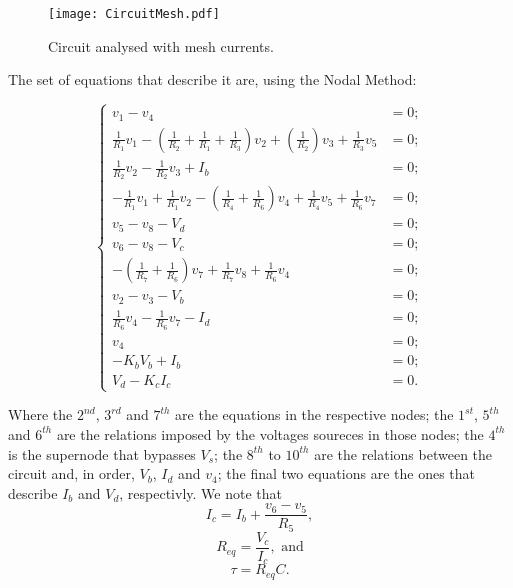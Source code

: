 \begin{figure}[h] \centering
\texttt{[image: CircuitMesh.pdf]}
\caption{Circuit analysed with mesh currents.}
\label{fig:Circuit_Passo2}
\end{figure}

The set of equations that describe it are, using the Nodal Method:

\begin{equation}
\begin{cases}
	v_1 - v_4 &= 0;																				  	  \\
	\frac{1}{R_1}v_1 - (\frac{1}{R_2}+\frac{1}{R_1}+\frac{1}{R_3})v_2 + (\frac{1}{R_2})v_3 + \frac{1}{R_3}v_5 &= 0; \\
  	\frac{1}{R_2}v_2 - \frac{1}{R_2}v_3+ I_b &= 0;													  \\
  	-\frac{1}{R_1}v_1 + \frac{1}{R_1}v_2 - (\frac{1}{R_4}+\frac{1}{R_6})v_4 + \frac{1}{R_4}v_5 + \frac{1}{R_6}v_7 &= 0;			  																	  \\
	v_5 - v_8 - V_d &= 0;																			  \\
  	v_6 - v_8 - V_c &= 0;											  	  							  \\
  	-(\frac{1}{R_7}+\frac{1}{R_6})v_7 + \frac{1}{R_7}v_8 + \frac{1}{R_6}v_4 &= 0;					  \\
	v_2 - v_3 - V_b &= 0;																			  \\
  	\frac{1}{R_6}v_4 - \frac{1}{R_6}v_7 - I_d &= 0;													  \\
  	v_4 &= 0;																						  \\
  	-K_bV_b + I_b &= 0;																				  \\
  	V_d - K_cI_c &= 0.
\end{cases}
\end{equation}

Where the $2^{nd}$, $3^{rd}$ and $7^{th}$ are the equations in the respective nodes; the $1^{st}$, $5^{th}$ and $6^{th}$ are the relations imposed by the voltages soureces in those nodes; the $4^{th}$ is the supernode that bypasses $V_s$; the $8^{th}$ to $10^{th}$ are the relations between the circuit and, in order, $V_b$, $I_d$ and $v_4$; the final two equations are the ones that describe $I_b$ and $V_d$, respectivly. 
We note that 
\begin{equation}
	I_c = I_b + \frac{v_6-v_5}{R_5},
\end{equation}
\begin{equation}
	R_{eq} = \frac{V_c}{I_c}, \text{ and}
\end{equation}
\begin{equation}
	\tau = R_{eq}C.
\end{equation}


